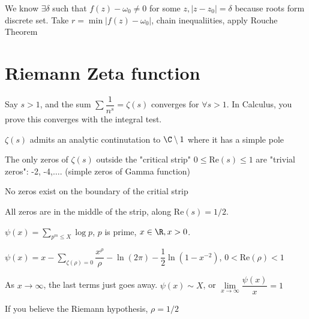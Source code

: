 \documentclass[10pt]{article}
\renewcommand{\Re}{\text{Re}}
\begin{document}
We know $\exists \delta$ such that $f(z) - \omega_0 \neq 0$ for some $z, |z-z_0| = \delta$ because roots form discrete set. Take $r = \min|f(z) - \omega_0|$, chain inequaliities, apply Rouche Theorem %


\section{Riemann Zeta function}
Say $s > 1$, and the sum $\sum\dfrac{1}{n^s} = \zeta(s)$ converges for $\forall s > 1$. In Calculus, you prove this converges with the integral test.

\begin{thm}
   $\zeta(s)$ admits an analytic continutation to $\C \setminus 1$ where it has a simple pole
\end{thm}

\begin{thm}
   The only zeros of $\zeta(s)$ outside the "critical strip" $0 \leq \Re(s) \leq 1$ are "trivial zeros": -2, -4,$\ldots$. (simple zeros of Gamma function)
\end{thm}

\begin{thm}
   No zeros exist on the boundary of the critial strip
\end{thm}

\begin{thm}
   All zeros are in the middle of the strip, along $\Re(s) = 1/2$.
\end{thm}

\begin{defn}
   $\psi(x) = \sum\limits_{p^m \leq X} \log p$, $p$ is prime, $x \in \R, x > 0$.
\end{defn}

\begin{defn}
   $\psi(x) = x - \sum\limits_{\zeta(\rho) = 0}\dfrac{x^\rho}{\rho} - \ln(2\pi) - \dfrac{1}{2}\ln(1-x^{-2})$, $0 < \Re(\rho) < 1$
\end{defn}

\begin{defn}
   As $x\to\infty$, the last terms just goes away. $\psi(x) \sim X$, or $\lim\limits_{x\to\infty} \dfrac{\psi(x)}{x} = 1$
\end{defn}

If you believe the Riemann hypothesis, $\rho = 1/2$
\end{document}
